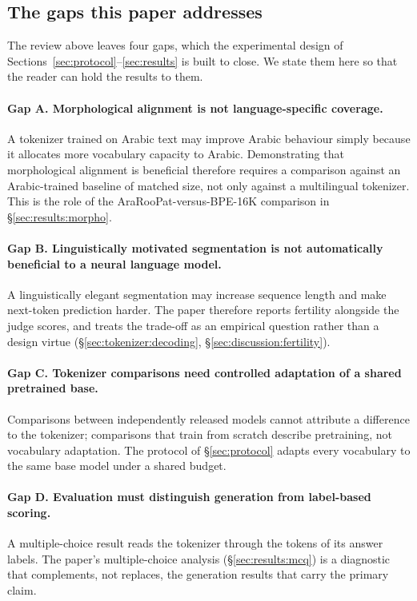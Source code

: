 \documentclass[a4paper,fleqn]{cas-sc}
\begin{document}
\subsection{The gaps this paper addresses}
\label{sec:related:gaps}

The review above leaves four gaps, which the experimental design of Sections~\ref{sec:protocol}--\ref{sec:results} is built to close. We state them here so that the reader can hold the results to them.

\paragraph{Gap A. Morphological alignment is not language-specific coverage.} A tokenizer trained on Arabic text may improve Arabic behaviour simply because it allocates more vocabulary capacity to Arabic. Demonstrating that morphological alignment is beneficial therefore requires a comparison against an Arabic-trained baseline of matched size, not only against a multilingual tokenizer. This is the role of the AraRooPat-versus-BPE-16K comparison in \S\ref{sec:results:morpho}.

\paragraph{Gap B. Linguistically motivated segmentation is not automatically beneficial to a neural language model.} A linguistically elegant segmentation may increase sequence length and make next-token prediction harder. The paper therefore reports fertility alongside the judge scores, and treats the trade-off as an empirical question rather than a design virtue (\S\ref{sec:tokenizer:decoding}, \S\ref{sec:discussion:fertility}).

\paragraph{Gap C. Tokenizer comparisons need controlled adaptation of a shared pretrained base.} Comparisons between independently released models cannot attribute a difference to the tokenizer; comparisons that train from scratch describe pretraining, not vocabulary adaptation. The protocol of \S\ref{sec:protocol} adapts every vocabulary to the same base model under a shared budget.

\paragraph{Gap D. Evaluation must distinguish generation from label-based scoring.} A multiple-choice result reads the tokenizer through the tokens of its answer labels. The paper's multiple-choice analysis (\S\ref{sec:results:mcq}) is a diagnostic that complements, not replaces, the generation results that carry the primary claim.
\end{document}
